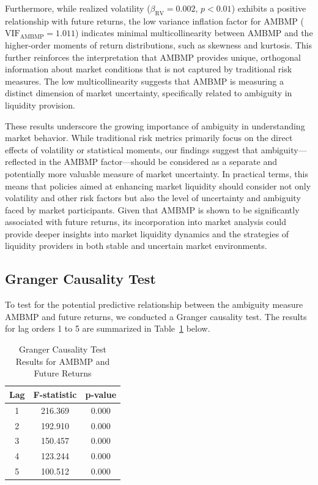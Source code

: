 \documentclass[preprint,12pt,authoryear]{elsarticle}
\begin{document}
Furthermore, while realized volatility (\(\beta_{\mathrm{RV}} = 0.002\), \(p < 0.01\)) exhibits a positive relationship with future returns, the low variance inflation factor for AMBMP (\(\mathrm{VIF}_{\mathrm{AMBMP}} = 1.011\)) indicates minimal multicollinearity between AMBMP and the higher-order moments of return distributions, such as skewness and kurtosis. This further reinforces the interpretation that AMBMP provides unique, orthogonal information about market conditions that is not captured by traditional risk measures. The low multicollinearity suggests that AMBMP is measuring a distinct dimension of market uncertainty, specifically related to ambiguity in liquidity provision.

These results underscore the growing importance of ambiguity in understanding market behavior. While traditional risk metrics primarily focus on the direct effects of volatility or statistical moments, our findings suggest that ambiguity—reflected in the AMBMP factor—should be considered as a separate and potentially more valuable measure of market uncertainty. In practical terms, this means that policies aimed at enhancing market liquidity should consider not only volatility and other risk factors but also the level of uncertainty and ambiguity faced by market participants. Given that AMBMP is shown to be significantly associated with future returns, its incorporation into market analysis could provide deeper insights into market liquidity dynamics and the strategies of liquidity providers in both stable and uncertain market environments.

\subsection{Granger Causality Test}
To test for the potential predictive relationship between the ambiguity measure $ \text{AMBMP} $ and future returns, we conducted a Granger causality test. The results for lag orders 1 to 5 are summarized in Table~\ref{tab:granger} below.

\begin{table}[h!]
\centering
\caption{Granger Causality Test Results for AMBMP and Future Returns}
\label{tab:granger}
\begin{tabular}{c c c}
\toprule
Lag & F-statistic & p-value \\ 
\midrule
1 & 216.369 & 0.000 \\
2 & 192.910 & 0.000 \\
3 & 150.457 & 0.000 \\
4 & 123.244 & 0.000 \\
5 & 100.512 & 0.000 \\
\bottomrule
\end{tabular}
\end{table}
\end{document}
